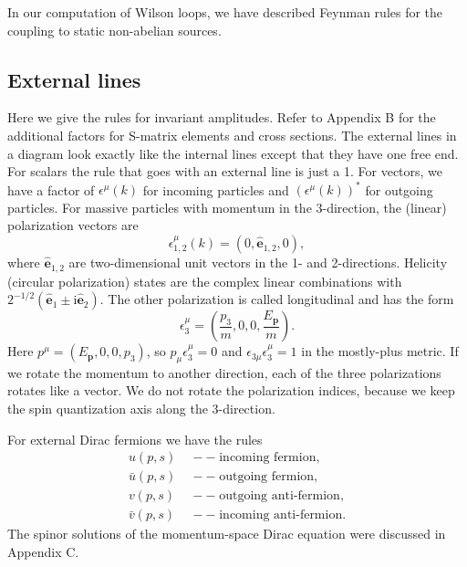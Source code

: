 In our computation of Wilson loops, we have described Feynman rules for the
coupling to static non-abelian sources.

\subsection{External lines}

Here we give the rules for invariant amplitudes. Refer to Appendix B for the
additional factors for S-matrix elements and cross sections. The external lines in
a diagram look exactly like the internal lines except that they have one free end.
For scalars the rule that goes with an external line is just a 1. For vectors, we
have a factor of \(\epsilon^\mu(k)\) for incoming particles and
\((\epsilon^\mu(k))^*\) for outgoing particles. For massive particles with momentum
in the 3-direction, the (linear) polarization vectors are
\begin{equation*}
  \epsilon^\mu_{1,2}(k)=(0,\widehat{\mathbf e}_{1,2},0),
\end{equation*}
where \(\widehat{\mathbf e}_{1,2}\) are two-dimensional unit vectors in the
1- and 2-directions. Helicity (circular polarization) states are the complex
linear combinations with
\(2^{-1/2}(\widehat{\mathbf e}_1\pm \mathrm{i}\widehat{\mathbf e}_2)\).
The other polarization is called longitudinal
and has the form
\begin{equation*}
  \epsilon^\mu_3=\left(\frac{p_3}{m},0,0,\frac{E_{\mathbf p}}{m}\right).
\end{equation*}
Here \(p^\mu=(E_{\mathbf p},0,0,p_3)\), so
\(p_\mu\epsilon^\mu_3=0\) and
\(\epsilon_{3\mu}\epsilon_3^\mu=1\) in the mostly-plus metric.
If we rotate the momentum to another direction, each of the three polarizations
rotates like a vector. We do not rotate the polarization indices, because we keep
the spin quantization axis along the 3-direction.

For external Dirac fermions we have the rules
\begin{align*}
  u(p,s) &\;--\; \text{incoming fermion},\\
  \bar u(p,s) &\;--\; \text{outgoing fermion},\\
  v(p,s) &\;--\; \text{outgoing anti-fermion},\\
  \bar v(p,s) &\;--\; \text{incoming anti-fermion}.
\end{align*}
The spinor solutions of the momentum-space Dirac equation were discussed in
Appendix C.


